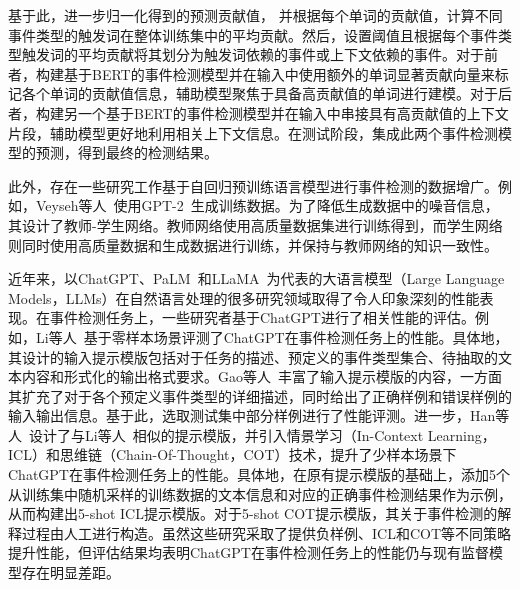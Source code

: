 基于此，进一步归一化得到的预测贡献值，
并根据每个单词的贡献值，计算不同事件类型的触发词在整体训练集中的平均贡献。然后，设置阈值且根据每个事件类型触发词的平均贡献将其划分为触发词依赖的事件或上下文依赖的事件。对于前者，构建基于BERT的事件检测模型并在输入中使用额外的单词显著贡献向量来标记各个单词的贡献值信息，辅助模型聚焦于具备高贡献值的单词进行建模。对于后者，构建另一个基于BERT的事件检测模型并在输入中串接具有高贡献值的上下文片段，辅助模型更好地利用相关上下文信息。在测试阶段，集成此两个事件检测模型的预测，得到最终的检测结果。

此外，存在一些研究工作基于自回归预训练语言模型进行事件检测的数据增广。例如，Veyseh等人~\cite{veyseh2021unleash}使用GPT-2~\cite{radford2019language}生成训练数据。为了降低生成数据中的噪音信息，其设计了教师-学生网络。教师网络使用高质量数据集进行训练得到，而学生网络则同时使用高质量数据和生成数据进行训练，并保持与教师网络的知识一致性。

近年来，以ChatGPT、PaLM~\cite{chowdhery2023palm}和LLaMA~\cite{touvron2023llama}为代表的大语言模型（Large Language Models，LLMs）在自然语言处理的很多研究领域取得了令人印象深刻的性能表现。在事件检测任务上，一些研究者基于ChatGPT进行了相关性能的评估。例如，Li等人~\cite{li2023evaluating}基于零样本场景评测了ChatGPT在事件检测任务上的性能。具体地，其设计的输入提示模版包括对于任务的描述、预定义的事件类型集合、待抽取的文本内容和形式化的输出格式要求。Gao等人~\cite{gao2023exploring}丰富了输入提示模版的内容，一方面其扩充了对于各个预定义事件类型的详细描述，同时给出了正确样例和错误样例的输入输出信息。基于此，选取测试集中部分样例进行了性能评测。进一步，Han等人~\cite{han2023information}设计了与Li等人~\cite{li2023evaluating}相似的提示模版，并引入情景学习（In-Context Learning，ICL）\cite{brown2020language}和思维链（Chain-Of-Thought，COT）\cite{wei2022chain}技术，提升了少样本场景下ChatGPT在事件检测任务上的性能。具体地，在原有提示模版的基础上，添加5个从训练集中随机采样的训练数据的文本信息和对应的正确事件检测结果作为示例，从而构建出5-shot ICL提示模版。对于5-shot COT提示模版，其关于事件检测的解释过程由人工进行构造。虽然这些研究采取了提供负样例、ICL和COT等不同策略提升性能，但评估结果均表明ChatGPT在事件检测任务上的性能仍与现有监督模型存在明显差距。

